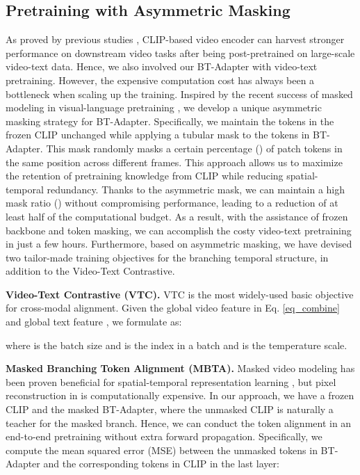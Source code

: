 \documentclass{article} \usepackage{iclr2024_conference,times}
\begin{document}
\subsection{Pretraining with Asymmetric Masking} \label{method_training}
As proved by previous studies \citep{zeng2023tvtsv2, wang2022internvideo, xue2022clip}, CLIP-based video encoder can harvest stronger performance on downstream video tasks after being post-pretrained on large-scale video-text data. Hence, we also involved our BT-Adapter with video-text pretraining. 
However, the expensive computation cost  has always been a bottleneck when scaling up the training. Inspired by the recent success of masked modeling in visual-language pretraining \citep{li2023scaling,tong2022videomae}, we develop a unique asymmetric masking strategy for BT-Adapter. Specifically, we maintain the tokens in the frozen CLIP unchanged while applying a tubular mask to the tokens in BT-Adapter. This mask randomly masks a certain percentage () of patch tokens in the same position across different frames. This approach allows us to maximize the retention of pretraining knowledge from CLIP while reducing spatial-temporal redundancy. Thanks to the asymmetric mask, we can maintain a high mask ratio () without compromising performance, leading to a reduction of at least half of the computational budget. As a result, with the assistance of frozen backbone and token masking, we can accomplish the costy video-text pretraining in just a few hours.
Furthermore, based on asymmetric masking, we have devised two tailor-made training objectives for the branching temporal structure, in addition to the Video-Text Contrastive.

\noindent \textbf{Video-Text Contrastive (VTC).}  VTC is the most widely-used basic objective for cross-modal alignment. Given the global video feature  in Eq. \ref{eq_combine} and global text feature , we formulate  as:

 where  is the batch size and  is the index in a batch and  is the temperature scale.

\noindent \textbf{Masked Branching Token Alignment (MBTA).} 
Masked video modeling has been proven beneficial for spatial-temporal representation learning \citep{tong2022videomae}, but pixel reconstruction in \citet{tong2022videomae} is computationally expensive. In our approach, we have a frozen CLIP and the masked BT-Adapter, where the unmasked CLIP is naturally a teacher for the masked branch. Hence, we can conduct the token alignment in an end-to-end pretraining without extra forward propagation. 
Specifically, we compute the mean squared error (MSE) between the unmasked tokens in BT-Adapter and the corresponding tokens in CLIP in the last layer:
\end{document}
